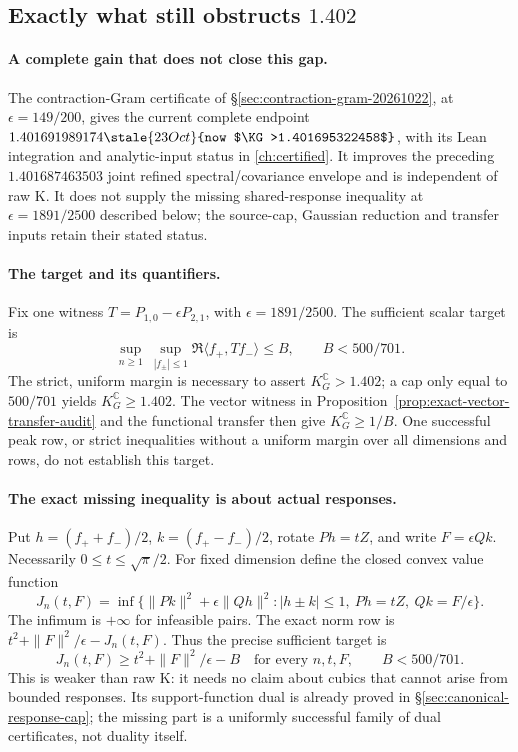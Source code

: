 \subsection{Exactly what still obstructs $1.402$}
\label{sec:obstruction-1402-audit}

\paragraph{A complete gain that does not close this gap.}
The contraction-Gram certificate of
\S\ref{sec:contraction-gram-20261022}, at $\epsilon=149/200$,
gives the current complete endpoint $1.401691989174\stale{23 Oct}{now $\KG>1.401695322458$}$, with
its Lean integration and analytic-input status in \autoref{ch:certified}.
It improves the preceding $1.401687463503$ joint refined spectral/covariance
envelope and is independent of raw K. It does not supply the missing shared-response
inequality at $\epsilon=1891/2500$ described below; the source-cap,
Gaussian reduction and transfer inputs retain their stated status.

\paragraph{The target and its quantifiers.}
Fix one witness $T=P_{1,0}-\epsilon P_{2,1}$, with
$\epsilon=1891/2500$. The sufficient scalar target is
\[
 \sup_{n\ge1}\ \sup_{|f_\pm|\le1}
 \Re\langle f_+,Tf_-\rangle\le B,\qquad B<500/701.
\]
The strict, uniform margin is necessary to assert $K_G^{\mathbb C}>1.402$;
a cap only equal to $500/701$ yields $K_G^{\mathbb C}\ge1.402$.
The vector witness in Proposition~\ref{prop:exact-vector-transfer-audit}
and the functional transfer then give $K_G^{\mathbb C}\ge1/B$.
One successful peak row, or strict inequalities without a uniform
margin over all dimensions and rows, do not establish this target.

\paragraph{The exact missing inequality is about actual responses.}
Put $h=(f_++f_-)/2$, $k=(f_+-f_-)/2$, rotate $Ph=tZ$, and write
$F=\epsilon Qk$. Necessarily $0\le t\le\sqrt\pi/2$. For fixed
dimension define the closed convex value function
\[
 J_n(t,F)=\inf\{\|Pk\|^2+\epsilon\|Qh\|^2:
        |h\pm k|\le1,\ Ph=tZ,\ Qk=F/\epsilon\}.
\]
The infimum is $+\infty$ for infeasible pairs. The exact norm row is
$t^2+\|F\|^2/\epsilon-J_n(t,F)$. Thus the precise sufficient target is
\begin{equation}\label{eq:obstruction-exact-response}
 \boxed{\quad J_n(t,F)\ge t^2+\|F\|^2/\epsilon-B
 \quad\text{for every }n,t,F,\qquad B<500/701.\quad}
\end{equation}
This is weaker than raw K: it needs no claim about cubics that cannot
arise from bounded responses. Its support-function dual is already
proved in \S\ref{sec:canonical-response-cap}; the missing part is a
uniformly successful family of dual certificates, not duality itself.

